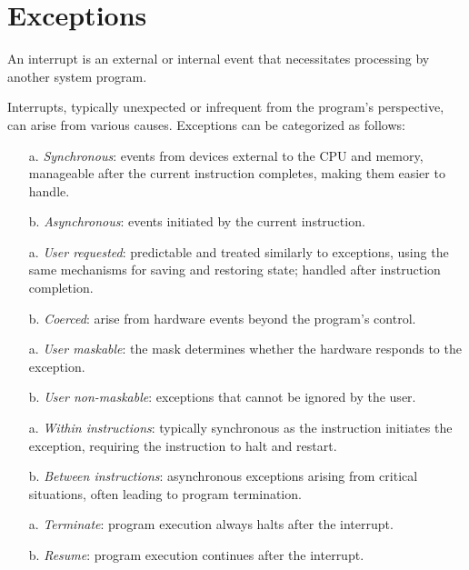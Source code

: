 \section{Exceptions}

\begin{definition}
    An interrupt is an external or internal event that necessitates processing by another system program.
\end{definition}
Interrupts, typically unexpected or infrequent from the program's perspective, can arise from various causes.
Exceptions can be categorized as follows:
\begin{itemize}
    \item [a.]\textit{Synchronous}: events from devices external to the CPU and memory, manageable after the current instruction completes, making them easier to handle.
    \item [b.]\textit{Asynchronous}: events initiated by the current instruction.
    \item [a.]\textit{User requested}: predictable and treated similarly to exceptions, using the same mechanisms for saving and restoring state; handled after instruction completion.
    \item [b.]\textit{Coerced}: arise from hardware events beyond the program's control.
    \item [a.]\textit{User maskable}: the mask determines whether the hardware responds to the exception.
    \item [b.]\textit{User non-maskable}: exceptions that cannot be ignored by the user.
    \item [a.]\textit{Within instructions}: typically synchronous as the instruction initiates the exception, requiring the instruction to halt and restart.
    \item [b.]\textit{Between instructions}: asynchronous exceptions arising from critical situations, often leading to program termination.
    \item [a.]\textit{Terminate}: program execution always halts after the interrupt.
    \item [b.]\textit{Resume}: program execution continues after the interrupt.
\end{itemize}

